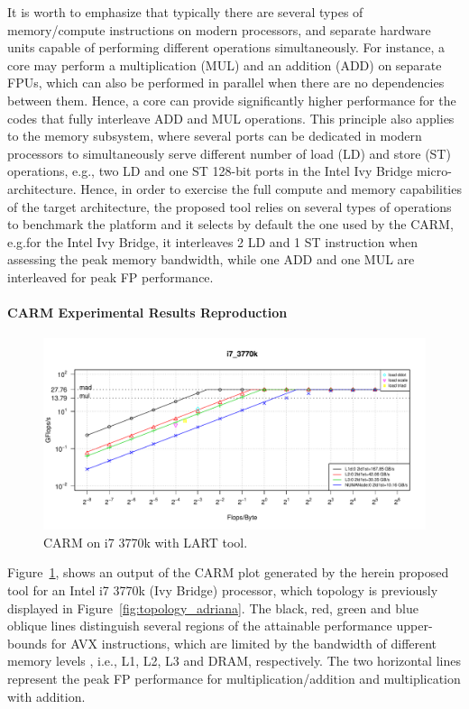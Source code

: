 \documentclass[twoside,twocolumn,8pt]{extarticle}
\begin{document}
It is worth to emphasize that typically there are several types of memory/compute instructions on modern processors, and separate
hardware units capable of performing different operations simultaneously. For instance, a core
may perform a multiplication (MUL) and an addition (ADD) on separate FPUs, which  can also be performed in parallel when there are
no  dependencies between them. Hence, a core can provide significantly higher  performance for the codes that fully interleave ADD
and MUL operations. This principle also applies to the memory subsystem, where several ports can be dedicated in modern processors
to simultaneously serve different number of load (LD) and store (ST) operations, e.g., two LD and one ST 128-bit ports in the Intel
Ivy Bridge micro-architecture. Hence, in order to exercise the full  compute and memory capabilities of the target architecture,
the proposed tool relies on several types of operations to benchmark the platform and it selects by default the one used by
the CARM, e.g.for the Intel Ivy Bridge, it interleaves 2 LD and 1 ST instruction  when assessing the peak memory bandwidth, while
one ADD and one MUL are interleaved for peak FP performance. 

\paragraph*{CARM Experimental Results Reproduction}
\begin{figure}
  \includegraphics[width=\textwidth]{pictures/roofline_model}
  \caption{CARM on i7 3770k with LART tool.}
  \label{fig:LART_adriana}
\end{figure}

Figure~\ref{fig:LART_adriana}, shows an output of the CARM plot generated by the herein proposed tool for an Intel i7
3770k (Ivy Bridge) processor, which topology is previously displayed in Figure~\ref{fig:topology_adriana}.
The black, red, green and blue oblique lines distinguish several regions of the attainable performance upper-bounds for AVX
instructions, which are limited by the bandwidth of different memory levels , i.e., L1, L2, L3 and DRAM, respectively.
The two horizontal lines represent the peak FP performance for multiplication/addition and multiplication with addition. 
\end{document}
